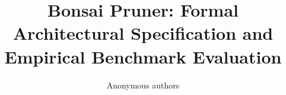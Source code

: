 \title{\textbf{Bonsai Pruner: Formal Architectural Specification and Empirical Benchmark Evaluation}}

\author{Anonymous authors}
